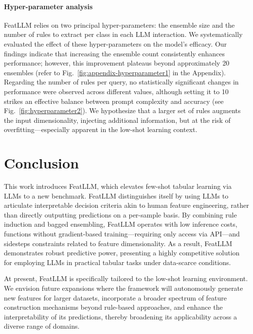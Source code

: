 \vspace*{-0.12in}
\paragraph{Hyper-parameter analysis}
\textsf{FeatLLM} relies on two principal hyper-parameters: the ensemble size and the number of rules to extract per class in each LLM interaction. We systematically evaluated the effect of these hyper-parameters on the model's efficacy. Our findings indicate that increasing the ensemble count consistently enhances performance; however, this improvement plateaus beyond approximately 20 ensembles (refer to Fig.~\ref{fig:appendix-hyperparameter1} in the Appendix). Regarding the number of rules per query, no statistically significant changes in performance were observed across different values, although setting it to 10 strikes an effective balance between prompt complexity and accuracy (see Fig.~\ref{fig:hyperparameter2}). We hypothesize that a larger set of rules augments the input dimensionality, injecting additional information, but at the risk of overfitting—especially apparent in the low-shot learning context.

\section{Conclusion}
This work introduces \textsf{FeatLLM}, which elevates few-shot tabular learning via LLMs to a new benchmark. \textsf{FeatLLM} distinguishes itself by using LLMs to articulate interpretable decision criteria akin to human feature engineering, rather than directly outputting predictions on a per-sample basis. By combining rule induction and bagged ensembling, \textsf{FeatLLM} operates with low inference costs, functions without gradient-based training—requiring only access via API—and sidesteps constraints related to feature dimensionality. As a result, \textsf{FeatLLM} demonstrates robust predictive power, presenting a highly competitive solution for employing LLMs in practical tabular tasks under data-scarce conditions.

At present, \textsf{FeatLLM} is specifically tailored to the low-shot learning environment. We envision future expansions where the framework will autonomously generate new features for larger datasets, incorporate a broader spectrum of feature construction mechanisms beyond rule-based approaches, and enhance the interpretability of its predictions, thereby broadening its applicability across a diverse range of domains.


